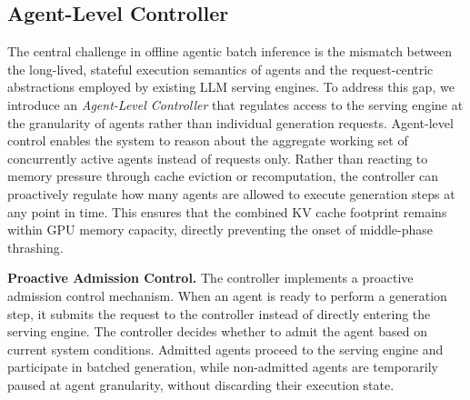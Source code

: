

\subsection{Agent-Level Controller}
The central challenge in offline agentic batch inference is the mismatch between the long-lived, stateful execution semantics of agents and the request-centric abstractions employed by existing LLM serving engines. To address this gap, we introduce an \emph{Agent-Level Controller} that regulates access to the serving engine at the granularity of agents rather than individual generation requests. 
Agent-level control enables the system to reason about the aggregate working set of concurrently active agents instead of requests only.
Rather than reacting to memory pressure through cache eviction or recomputation, the controller can proactively regulate how many agents are allowed to execute generation steps at any point in time.
This ensures that the combined KV cache footprint remains within GPU memory capacity, directly preventing the onset of middle-phase thrashing.

\noindent\textbf{Proactive Admission Control.} The controller implements a proactive admission control mechanism.
When an agent is ready to perform a generation step, it submits the request to the controller instead of directly entering the serving engine.
The controller decides whether to admit the agent based on current system conditions.
Admitted agents proceed to the serving engine and participate in batched generation, while non-admitted agents are temporarily paused at agent granularity, without discarding their execution state.


